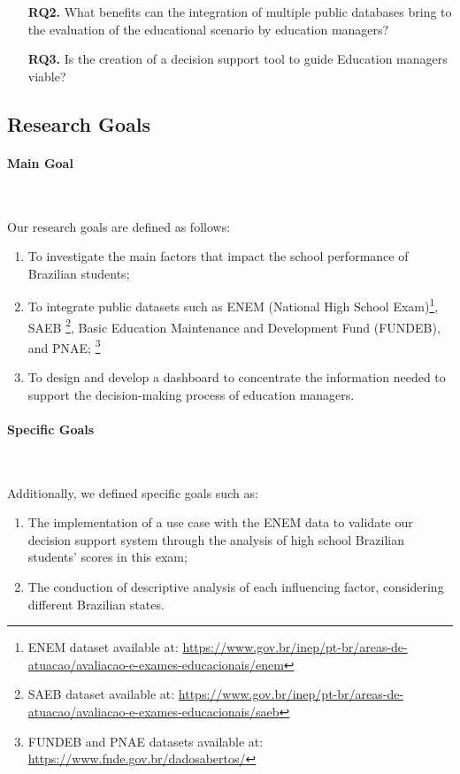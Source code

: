 \documentclass[12pt]{article}
\begin{document}
\begin{itemize}
    \item[\textbf{RQ2.}] What benefits can the integration of multiple public databases bring to the evaluation of the educational scenario by education managers?
\end{itemize}

\begin{itemize}
    \item[\textbf{RQ3.}]  Is the creation of a decision support tool to guide Education managers viable?
\end{itemize}

\subsection{Research Goals}

\paragraph{Main Goal}\

Our research goals are defined as follows: 

\begin{enumerate}
    \item To investigate the main factors that impact the school performance of Brazilian students;
    \item To integrate public datasets such as ENEM (National High School Exam)\footnote{ENEM dataset available at: \url{https://www.gov.br/inep/pt-br/areas-de-atuacao/avaliacao-e-exames-educacionais/enem}}, SAEB \footnote{SAEB dataset available at: \url{https://www.gov.br/inep/pt-br/areas-de-atuacao/avaliacao-e-exames-educacionais/saeb}}, Basic Education Maintenance and Development Fund (FUNDEB), and PNAE; \footnote{FUNDEB and PNAE datasets available at: \url{https://www.fnde.gov.br/dadosabertos/}}
    \item To design and develop a dashboard to concentrate the information needed to support the decision-making process of education managers.
    
\end{enumerate}


\paragraph{Specific Goals}\

Additionally, we defined specific goals such as: 

\begin{enumerate}
    \item The implementation of a use case with the ENEM data to validate our decision support system through the analysis of high school Brazilian students' scores in this exam;
    \item The conduction of descriptive analysis of each influencing factor, considering different Brazilian states.
\end{enumerate}
\end{document}
